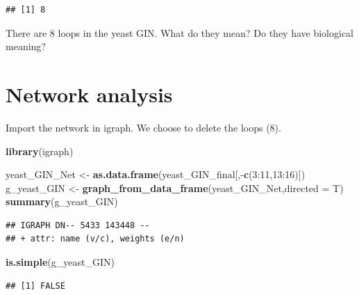 \documentclass[12pt,]{article}
\newenvironment{Shaded}{\begin{snugshade}}{\end{snugshade}}
\newcommand{\KeywordTok}[1]{\textcolor[rgb]{0.13,0.29,0.53}{\textbf{{#1}}}}
\newcommand{\DataTypeTok}[1]{\textcolor[rgb]{0.13,0.29,0.53}{{#1}}}
\newcommand{\DecValTok}[1]{\textcolor[rgb]{0.00,0.00,0.81}{{#1}}}
\newcommand{\StringTok}[1]{\textcolor[rgb]{0.31,0.60,0.02}{{#1}}}
\newcommand{\CommentTok}[1]{\textcolor[rgb]{0.56,0.35,0.01}{\textit{{#1}}}}
\newcommand{\NormalTok}[1]{{#1}}
\begin{document}
\begin{verbatim}
## [1] 8
\end{verbatim}

There are 8 loops in the yeast GIN. What do they mean? Do they have
biological meaning?

\section{Network analysis}\label{network-analysis}

Import the network in igraph. We choose to delete the loops (8).

\begin{Shaded}
\begin{Highlighting}[]
\KeywordTok{library}\NormalTok{(igraph)}

\NormalTok{yeast_GIN_Net <-}\StringTok{ }\KeywordTok{as.data.frame}\NormalTok{(yeast_GIN_final[,-}\KeywordTok{c}\NormalTok{(}\DecValTok{3}\NormalTok{:}\DecValTok{11}\NormalTok{,}\DecValTok{13}\NormalTok{:}\DecValTok{16}\NormalTok{)])}
\NormalTok{g_yeast_GIN <-}\StringTok{ }\KeywordTok{graph_from_data_frame}\NormalTok{(yeast_GIN_Net,}\DataTypeTok{directed =} \NormalTok{T)}
\KeywordTok{summary}\NormalTok{(g_yeast_GIN)}
\end{Highlighting}
\end{Shaded}

\begin{verbatim}
## IGRAPH DN-- 5433 143448 -- 
## + attr: name (v/c), weights (e/n)
\end{verbatim}

\begin{Shaded}
\begin{Highlighting}[]
\KeywordTok{is.simple}\NormalTok{(g_yeast_GIN)}
\end{Highlighting}
\end{Shaded}

\begin{verbatim}
## [1] FALSE
\end{verbatim}

\begin{Shaded}
\end{Shaded}
\end{document}
